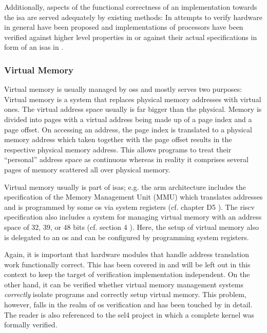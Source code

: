 Additionally, aspects of the functional correctness of an implementation towards the \gls{isa} are served adequately by existing methods:
In \cite{Zhang15, Mukherjee16} attempts to verify hardware in general have been proposed and implementations of processors have been verified against higher level properties in \cite{Beatty94, Berezin98, Trippel19} or against their actual specifications in form of an \glspl{isa} in \cite{Burch94, Reid16, RISCV-formal}.

\subsubsection{Virtual Memory}

Virtual memory is usually managed by \glspl{os} and mostly serves two purposes: 
Virtual memory is a system that replaces physical memory addresses with virtual ones.
The virtual address space usually is far bigger than the physical.
Memory is divided into pages with a virtual address being made up of a page index and a page offset.
On accessing an address, the page index is translated to a physical memory address which taken together with the page offset results in the respective physical memory address.
This allows programs to treat their \enquote{personal} address space as continuous whereas in reality it comprises several pages of memory scattered all over physical memory.

Virtual memory usually is part of \glspl{isa}; e.g. the \gls{arm} architecture includes the specification of the Memory Management Unit (MMU) which translates addresses and is programmed by some \gls{os} via system registers (cf. chapter D5 \cite{Armv8}).
The \gls{riscv} specification also includes a system for managing virtual memory with an address space of 32, 39, or 48 bits (cf. section 4 \cite{RiscVISAP}).
Here, the setup of virtual memory also is delegated to an \gls{os} and can be configured by programming system registers.

Again, it is important that hardware modules that handle address translation work functionally correct.
This has been covered in \cite{Dalinger05} and will be left out in this context to keep the target of verification implementation independent.
On the other hand, it can be verified whether virtual memory management systems \textit{correctly} isolate programs and correctly setup virtual memory.
This problem, however, falls in the realm of \gls{os} verification and has been touched by \cite{Vaynberg12} in detail.
The reader is also referenced to the sel4 project \cite{Klein09} in which a complete kernel was formally verified.

